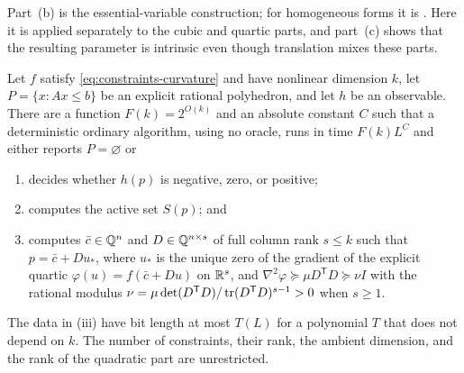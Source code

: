 Part~(b) is the essential-variable construction; for homogeneous forms it is
\citet[Proposition~1]{Carlini2006}. Here it is applied separately to the cubic
and quartic parts, and part~(c) shows that the resulting parameter is
intrinsic even though translation mixes these parts.

\begin{theorem}
\label{thm:constraints-nonlinear}
Let $f$ satisfy \eqref{eq:constraints-curvature} and have nonlinear
dimension $k$, let $P=\{x:Ax\le b\}$ be an explicit rational polyhedron, and
let $h$ be an observable. There are a function $F(k)=2^{O(k)}$ and an
absolute constant $C$ such that a deterministic ordinary algorithm, using no
oracle, runs in time $F(k)L^{C}$ and either reports $P=\varnothing$ or
\begin{enumerate}[label=(\roman*)]
\item decides whether $h(p)$ is negative, zero, or positive;
\item computes the active set $S(p)$; and
\item computes $\bar c\in\mathbb Q^n$ and $D\in\mathbb Q^{n\times s}$ of full column rank
$s\le k$ such that $p=\bar c+Du_*$, where $u_*$ is the unique zero of the
gradient of the explicit quartic $\varphi(u)=f(\bar c+Du)$ on $\mathbb R^s$, and
$\nabla^2\varphi\succeq\mu D^{\mathsf T}D\succeq\nu I$ with the rational
modulus $\nu=\mu\det(D^{\mathsf T}D)/\operatorname{tr}(D^{\mathsf T}D)^{s-1}>0$ when $s\ge1$.
\end{enumerate}
The data in (iii) have bit length at most $T(L)$ for a polynomial $T$ that
does not depend on $k$. The number of constraints, their rank, the ambient
dimension, and the rank of the quadratic part are unrestricted.
\end{theorem}


